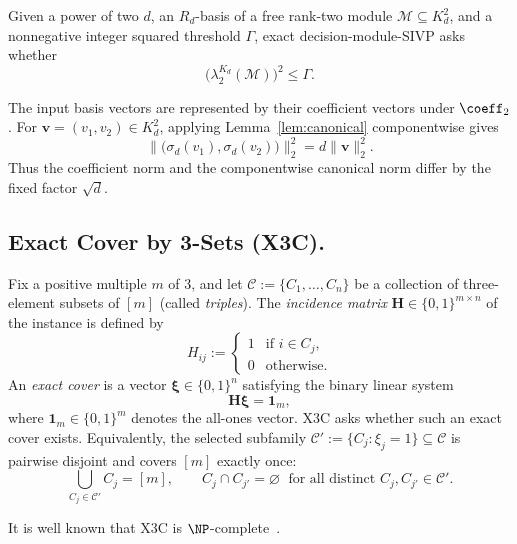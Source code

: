 \begin{definition}
\label{def:module-sivp}
Given a power of two \(d\), an \(R_d\)-basis of a free rank-two module
\(\mathcal M\subseteq K_d^2\), and a nonnegative integer squared threshold
\(\Gamma\), exact decision-module-SIVP asks whether
\[
 \bigl(\lambda_2^{K_d}(\mathcal M)\bigr)^2\leq\Gamma.
\]
\end{definition}
{The input basis vectors are represented by their coefficient
vectors under \(\coeff_2\).}
For \(\mathbf v=(v_1,v_2)\in K_d^2\), applying
Lemma~\ref{lem:canonical} componentwise gives
\[
 \|\bigl(\sigma_d(v_1),\sigma_d(v_2)\bigr)\|_2^2
 =d\|\mathbf v\|_2^2.
\]
Thus the coefficient norm and the componentwise canonical norm differ by the
fixed factor \(\sqrt d\).
\fi

\subsection{Exact Cover by 3-Sets (X3C).}
Fix a positive multiple \(m\) of \(3\), and let
\(\mathcal C\mathrel{:=}\{C_1,\ldots,C_n\}\) be a collection of
three-element subsets of \([m]\) (called \emph{triples}).
The \emph{incidence matrix}
$\mathbf{H} \in \{0,1\}^{m \times n}$ of the instance is defined by
\[
H_{ij} \mathrel{:=}
\begin{cases}
1 & \text{if }i\in C_j,\\[2pt]
0 & \text{otherwise.}
\end{cases}
\]
An \emph{exact cover} is a vector $\boldsymbol{\xi} \in \{0,1\}^n$ satisfying
the binary linear system
\[
\mathbf{H}\boldsymbol{\xi} = \mathbf{1}_m,
\]
where $\mathbf{1}_m \in \{0,1\}^m$ denotes the all-ones vector.
X3C asks whether such an exact cover exists.
Equivalently, the selected subfamily
$\mathcal{C}' \mathrel{:=} \{C_j : \xi_j = 1\} \subseteq \mathcal{C}$ is pairwise
disjoint and covers \([m]\) exactly once:
\[
\bigcup_{C_j \in \mathcal{C}'} C_j = [m],
\qquad
C_j \cap C_{j'} = \varnothing
\;\text{ for all distinct } C_j, C_{j'} \in \mathcal{C}'.
\]

It is well known that X3C is \(\NP\)-complete~\cite{GareyJohnson}.
